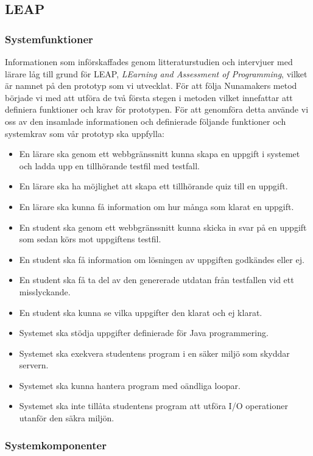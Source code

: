 \documentclass[a4paper,11pt]{article}
\begin{document}
{\newpage
\subsection{LEAP} \label{LEAP}
\subsubsection{Systemfunktioner} \label{systemfunktioner}
Informationen som införskaffades genom litteraturstudien och intervjuer med lärare låg till grund för LEAP, \textit{LEarning and Assessment of Programming}, vilket är namnet på den prototyp som vi utvecklat. För att följa Nunamakers metod började vi med att utföra de två första stegen i metoden vilket innefattar att definiera funktioner och krav för prototypen. För att genomföra detta använde vi oss av den insamlade informationen och definierade följande funktioner och systemkrav som vår prototyp ska uppfylla:

\begin{itemize}
\item
En lärare ska genom ett webbgränssnitt kunna skapa en uppgift i systemet och ladda upp en tillhörande testfil med testfall.
\item
En lärare ska ha möjlighet att skapa ett tillhörande quiz till en uppgift.
\item
En lärare ska kunna få information om hur många som klarat en uppgift.
\item
En student ska genom ett webbgränssnitt kunna skicka in svar på en uppgift som sedan körs mot uppgiftens testfil.
\item
En student ska få information om lösningen av uppgiften godkändes eller ej.
\item
En student ska få ta del av den genererade utdatan från testfallen vid ett misslyckande.
\item
En student ska kunna se vilka uppgifter den klarat och ej klarat.
\item
Systemet ska stödja uppgifter definierade för Java programmering.
\item
Systemet ska exekvera studentens program i en säker miljö som skyddar servern.
\item
Systemet ska kunna hantera program med oändliga loopar.
\item
Systemet ska inte tillåta studentens program att utföra I/O operationer utanför den säkra miljön.
\end{itemize}

\subsubsection{Systemkomponenter} \label{systemkomponenter}

}
\end{document}
